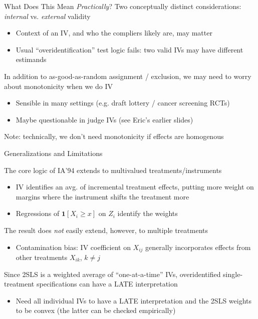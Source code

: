 \documentclass{beamer}
\begin{document}

\begin{frame}{What Does This Mean \emph{Practically}?} 
Two conceptually distinct considerations: \emph{internal} vs. \emph{external} validity\smallskip
\begin{itemize}
\item Context of an IV, and who the compliers likely are, may matter\smallskip
\item Usual ``overidentification'' test logic fails: two valid IVs may have different estimands
\end{itemize}\medskip\pause{}
In addition to as-good-as-random assignment / exclusion, we may need to worry about monotonicity when we do IV\smallskip
\begin{itemize}
\item Sensible in many settings (e.g. draft lottery / cancer screening RCTs) \smallskip
\item Maybe questionable in judge IVs (see Eric's earlier slides)
\end{itemize}\medskip\pause{}

Note: technically, we don't need monotonicity if effects are homogenous
\end{frame}

\begin{frame}{Generalizations and Limitations}

\vspace{-0.2cm}
The core logic of IA'94 extends to multivalued treatments/instruments
\begin{itemize}
\item IV identifies an avg. of incremental treatment effects, putting more weight on margins where the instrument shifts the treatment more
\item Regressions of $\mathbf{1}[X_i\ge x]$ on $Z_i$ identify the weights
\end{itemize}\medskip\pause{}
The result does \emph{not} easily extend, however, to multiple treatments 
\begin{itemize}
\item Contamination bias: IV coefficient on $X_{ij}$ generally incorporates effects from other treatments $X_{ik}$, $k\neq j$ 
\end{itemize}\medskip\pause{}
Since 2SLS is a weighted average of ``one-at-a-time'' IVs, overidentified single-treatment specifications can have a LATE interpretation
\begin{itemize}
\item Need all individual IVs to have a LATE interpretation and the 2SLS weights to be convex (the latter can be checked empirically)
\end{itemize}
\end{frame}
\end{document}
